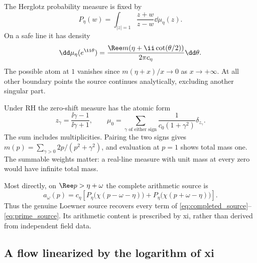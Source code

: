 The Herglotz probability measure is fixed by
\begin{equation}
 P_\eta(w)=\int_{|z|=1}\frac{z+w}{z-w}\dd\mu_\eta(z).
 \label{eq:driving_measure}
\end{equation}
On a safe line it has density
\begin{equation}
 \dd\mu_\eta(e^{\ii\theta})=
 \frac{\Ree m(\eta+\ii\cot(\theta/2))}{2\pi c_\eta}\dd\theta.
\end{equation}
The possible atom at $1$ vanishes since $m(\eta+x)/x\to0$ as
$x\to+\infty$. At all other boundary points the source continues
analytically, excluding another singular part.

Under RH the zero-shift measure has the atomic form
\begin{equation}
 z_\gamma=\frac{\ii\gamma-1}{\ii\gamma+1},\qquad
 \mu_0=\sum_{\gamma\text{ of either sign}}
 \frac{1}{c_0(1+\gamma^2)}\delta_{z_\gamma}.
 \label{eq:atomic_measure}
\end{equation}
The sum includes multiplicities. Pairing the two signs gives
$m(p)=\sum_{\gamma>0}2p/(p^2+\gamma^2)$, and evaluation at $p=1$
shows total mass one. The summable weights matter: a real-line measure
with unit mass at every zero would have infinite total mass.

Most directly, on $\Ree p>\eta+\omega$ the complete arithmetic source is
\begin{equation}
 \boxed{a_\omega(p)=c_\eta\left[
 P_\eta\bigl(\chi(p-\omega-\eta)\bigr)+
 P_\eta\bigl(\chi(p+\omega-\eta)\bigr)\right].}
 \label{eq:source_recovery}
\end{equation}
Thus the genuine Loewner source recovers every term of
\eqref{eq:completed_source}--\eqref{eq:prime_source}. Its arithmetic
content is prescribed by xi, rather than derived from independent field
data.

\subsection{A flow linearized by the logarithm of xi}

